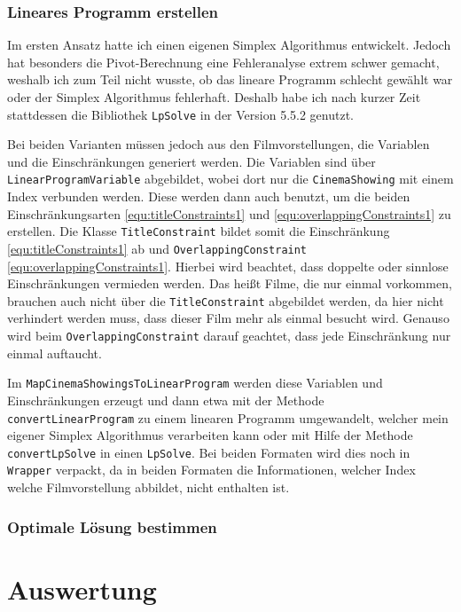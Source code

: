 \documentclass[a4paper, 12pt]{article}
\begin{document}
\subsubsection{Lineares Programm erstellen}

Im ersten Ansatz hatte ich einen eigenen Simplex Algorithmus entwickelt.
Jedoch hat besonders die Pivot-Berechnung eine Fehleranalyse extrem schwer gemacht, weshalb ich zum Teil nicht wusste, ob das lineare Programm schlecht gewählt war oder der Simplex Algorithmus fehlerhaft.
Deshalb habe ich nach kurzer Zeit stattdessen die Bibliothek \texttt{LpSolve} in der Version 5.5.2 genutzt.

Bei beiden Varianten müssen jedoch aus den Filmvorstellungen, die Variablen und die Einschränkungen generiert werden.
Die Variablen sind über \texttt{LinearProgramVariable} abgebildet, wobei dort nur die \texttt{CinemaShowing} mit einem Index verbunden werden.
Diese werden dann auch benutzt, um die beiden Einschränkungsarten \eqref{equ:titleConstraints1} und \eqref{equ:overlappingConstraints1} zu erstellen.
Die Klasse \linebreak \texttt{TitleConstraint} bildet somit die Einschränkung \eqref{equ:titleConstraints1} ab und \linebreak \texttt{OverlappingConstraint} \eqref{equ:overlappingConstraints1}.
Hierbei wird beachtet, dass doppelte oder sinnlose Einschränkungen vermieden werden.
Das heißt Filme, die nur einmal vorkommen, brauchen auch nicht über die \texttt{TitleConstraint} abgebildet werden, da hier nicht verhindert werden muss, dass dieser Film mehr als einmal besucht wird.
Genauso wird beim \texttt{OverlappingConstraint} darauf geachtet, dass jede Einschränkung nur einmal auftaucht.

Im \texttt{MapCinemaShowingsToLinearProgram} werden diese Variablen und Einschränkungen erzeugt und dann etwa mit der Methode \linebreak \texttt{convertLinearProgram} zu einem linearen Programm umgewandelt, welcher mein eigener Simplex Algorithmus verarbeiten kann oder mit Hilfe der Methode \texttt{convertLpSolve} in einen \texttt{LpSolve}.
Bei beiden Formaten wird dies noch in \texttt{Wrapper} verpackt, da in beiden Formaten die Informationen, welcher Index welche Filmvorstellung abbildet, nicht enthalten ist.

\subsubsection{Optimale Lösung bestimmen}



\section{Auswertung}
\end{document}
